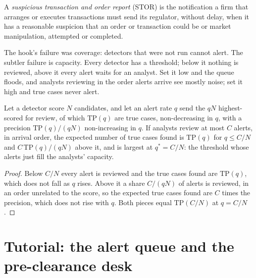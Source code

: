 \begin{definition}\label{def:fm:compliance-and-market-abuse:stor}
A \emph{suspicious transaction and order report} (STOR) is the notification a firm that arranges or
executes transactions must send its regulator, without delay, when it has a reasonable suspicion that an order or transaction could be  or market manipulation, attempted or completed.
\end{definition}

The hook's failure was coverage: detectors that were not run cannot alert. The subtler failure is capacity. Every detector has a threshold; below
it nothing is reviewed, above it every alert waits for an analyst. Set it low and the queue floods, and analysts reviewing in the order alerts arrive
see mostly noise; set it high and true cases never alert.

\begin{proposition}\label{prop:fm:compliance-and-market-abuse:queue}
Let a detector score $N$ candidates, and let an alert rate $q$ send the $qN$ highest-scored for review, of which $\mathrm{TP}(q)$ are true cases,
non-decreasing in $q$, with a precision $\mathrm{TP}(q)/(qN)$ non-increasing in $q$. If analysts review at most $C$ alerts, in arrival order, the
expected number of true cases found is $\mathrm{TP}(q)$ for $q\le C/N$ and $C\,\mathrm{TP}(q)/(qN)$ above it, and is largest at $q^*=C/N$: the
threshold whose alerts just fill the analysts' capacity.
\end{proposition}

\begin{proof}
Below $C/N$ every alert is reviewed and the true cases found are $\mathrm{TP}(q)$, which does not fall as $q$ rises. Above it a share $C/(qN)$ of
alerts is reviewed, in an order unrelated to the score, so the expected true cases found are $C$ times the precision, which does not rise with
$q$. Both pieces equal $\mathrm{TP}(C/N)$ at $q=C/N$.
\end{proof}

\label{lst:fm:compliance-and-market-abuse:triage}

\section{Tutorial: the alert queue and the pre-clearance desk}\label{tut:fm:compliance-and-market-abuse:tut}

